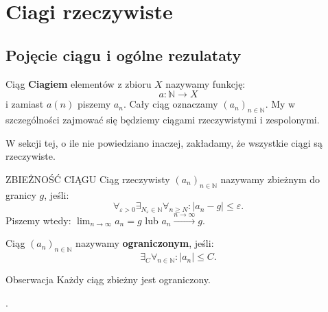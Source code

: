 \documentclass{article}
\newcommand{\N}{\mathbb{N}}
\newcommand{\oo}{\infty}
\newcommand{\eps}{\varepsilon}
\newcommand{\ciag}[1]{(#1_{n})_{n \in \N}}
\begin{document}
\section{Ciagi rzeczywiste}
    \subsection{Pojęcie ciągu i ogólne rezulataty}
    \begin{defr}{Ciąg}
        \textbf{Ciagiem} elementów z zbioru $X$ nazywamy funkcję:
        \begin{equation}
            a: \N \to X
        \end{equation}
        i zamiast $a(n)$ piszemy $a_n$. Cały ciąg oznaczamy $(a_n)_{n \in \N}$. My w szczególności zajmować się będziemy ciągami rzeczywistymi i zespolonymi.
    \end{defr}    
    W sekcji tej, o ile nie powiedziano inaczej, zakładamy, że wszystkie ciągi są rzeczywiste.
    \begin{defr}{ZBIEŻNOŚĆ CIĄGU}
        Ciąg rzeczywisty $\ciag{a}$ nazywamy zbieżnym do granicy $g$, jeśli:
        \begin{equation}
            \forall_{\eps > 0} \exists_{N_{\eps} \in \N} \forall_{n \geqslant N}: |a_n - g| \leqslant \eps.
        \end{equation}
        Piszemy wtedy: $\lim_{n \to \oo} a_n = g$ lub $a_n \xrightarrow{n \to \oo} g$.
    \end{defr}

    Ciąg $\ciag{a}$ nazywamy \textbf{ograniczonym}, jeśli:
    \begin{equation}
        \exists_{C} \forall_{n \in \N}: |a_n| \leqslant C.
    \end{equation}

    \begin{obs}{Obserwacja}
        Każdy ciąg zbieżny jest ograniczony.
    \end{obs}.
\end{document}
